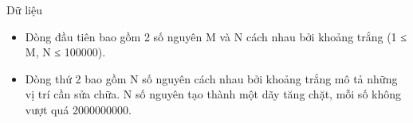 Dữ liệu
\begin{itemize}
	\item     Dòng đầu tiên bao gồm 2 số nguyên M và N cách nhau bởi khoảng trắng (1 ≤ M, N ≤ 100000).   
	\item     Dòng thứ 2 bao gồm N số nguyên cách nhau bởi khoảng trắng mô tả những vị trí cần sửa chữa. N số nguyên tạo thành một dãy tăng chặt, mỗi số không vượt quá 2000000000.   
\end{itemize}